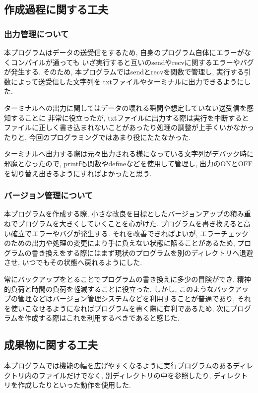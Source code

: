 \documentclass[a4j]{jarticle}
\begin{document}
\subsection{作成過程に関する工夫}
\subsubsection{出力管理について}
本プログラムはデータの送受信をするため, 自身のプログラム自体にエラーがなくコンパイルが通っても
いざ実行すると互いのsendやrecvに関するエラーやバグが発生する. 
そのため, 本プログラムではsendとrecvを関数で管理し, 実行する引数によって送受信した文字列を
txtファイルやターミナルに出力できるようにした. 

ターミナルへの出力に関してはデータの壊れる瞬間や想定していない送受信を感知することに
非常に役立ったが, txtファイルに出力する際は実行を中断するとファイルに正しく書き込まれないことがあったり処理の調整が上手くいかなかったりと, 今回のプログラミングではあまり役にたたなかった. 

ターミナルへ出力する際は元々出力される様になっている文字列がデバック時に邪魔となったので, 
printfも関数やdefineなどを使用して管理し, 出力のONとOFFを切り替え出きるようにすればよかったと思う. 

\subsubsection{バージョン管理について}
本プログラムを作成する際, 小さな改良を目標としたバージョンアップの積み重ねでプログラムを大きくしていくことを心がけた. プログラムを書き換えると高い確立でエラーやバグが発生する. それを改善できればよいが, エラーチェックのための出力や処理の変更により手に負えない状態に陥ることがあるため, プログラムの書き換えをする際にはまず現状のプログラムを別のディレクトリへ退避させ, いつでもその状態へ戻れるようにした. 

常にバックアップをとることでプログラムの書き換えに多少の冒険ができ, 精神的負荷と時間の負荷を軽減することに役立った. しかし, このようなバックアップの管理などはバージョン管理システムなどを利用することが普通であり, それを使いこなせるようになればプログラムを書く際に有利であるため, 次にプログラムを作成する際はこれを利用するべきであると感じた. 

\subsection{成果物に関する工夫}
本プログラムでは機能の幅を広げやすくなるように実行プログラムのあるディレクトリ内のファイルだけでなく, 
別ディレクトリの中を参照したり, ディレクトリを作成したりといった動作を使用した.
\end{document}
